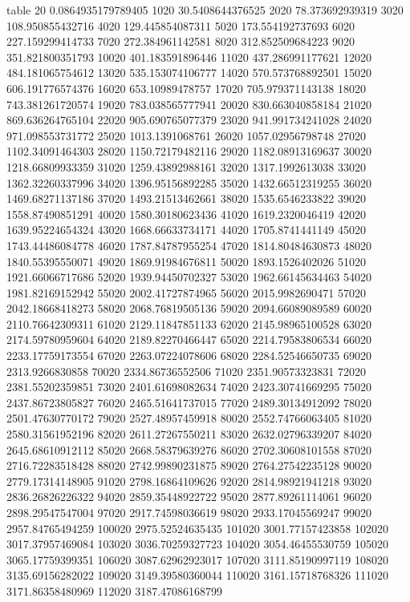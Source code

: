 table {%
20 0.0864935179789405
1020 30.5408644376525
2020 78.373692939319
3020 108.950855432716
4020 129.445854087311
5020 173.554192737693
6020 227.159299414733
7020 272.384961142581
8020 312.852509684223
9020 351.821800351793
10020 401.183591896446
11020 437.286991177621
12020 484.181065754612
13020 535.153074106777
14020 570.573768892501
15020 606.191776574376
16020 653.10989478757
17020 705.979371143138
18020 743.381261720574
19020 783.038565777941
20020 830.663040858184
21020 869.636264765104
22020 905.690765077379
23020 941.991734241028
24020 971.098553731772
25020 1013.1391068761
26020 1057.02956798748
27020 1102.34091464303
28020 1150.72179482116
29020 1182.08913169637
30020 1218.66809933359
31020 1259.43892988161
32020 1317.1992613038
33020 1362.32260337996
34020 1396.95156892285
35020 1432.66512319255
36020 1469.68271137186
37020 1493.21513462661
38020 1535.6546233822
39020 1558.87490851291
40020 1580.30180623436
41020 1619.2320046419
42020 1639.95224654324
43020 1668.66633734171
44020 1705.8741441149
45020 1743.44486084778
46020 1787.84787955254
47020 1814.80484630873
48020 1840.55395550071
49020 1869.91984676811
50020 1893.1526402026
51020 1921.66066717686
52020 1939.94450702327
53020 1962.66145634463
54020 1981.82169152942
55020 2002.41727874965
56020 2015.9982690471
57020 2042.18668418273
58020 2068.76819505136
59020 2094.66089089589
60020 2110.76642309311
61020 2129.11847851133
62020 2145.98965100528
63020 2174.59780959604
64020 2189.82270466447
65020 2214.79583806534
66020 2233.17759173554
67020 2263.07224078606
68020 2284.52546650735
69020 2313.9266830858
70020 2334.86736552506
71020 2351.90573323831
72020 2381.55202359851
73020 2401.61698082634
74020 2423.30741669295
75020 2437.86723805827
76020 2465.51641737015
77020 2489.30134912092
78020 2501.47630770172
79020 2527.48957459918
80020 2552.74766063405
81020 2580.31561952196
82020 2611.27267550211
83020 2632.02796339207
84020 2645.68610912112
85020 2668.58379639276
86020 2702.30608101558
87020 2716.72283518428
88020 2742.99890231875
89020 2764.27542235128
90020 2779.17314148905
91020 2798.16864109626
92020 2814.98921941218
93020 2836.26826226322
94020 2859.35448922722
95020 2877.89261114061
96020 2898.29547547004
97020 2917.74598036619
98020 2933.17045569247
99020 2957.84765494259
100020 2975.52524635435
101020 3001.77157423858
102020 3017.37957469084
103020 3036.70259327723
104020 3054.46455530759
105020 3065.17759399351
106020 3087.62962923017
107020 3111.85190997119
108020 3135.69156282022
109020 3149.39580360044
110020 3161.15718768326
111020 3171.86358480969
112020 3187.47086168799
}
